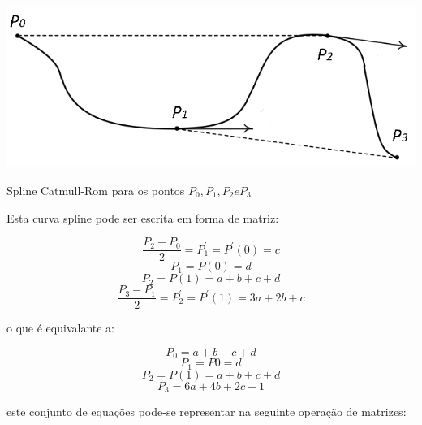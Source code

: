 \begin{center}
 	
 	\includegraphics[scale=0.5,keepaspectratio]{resources/catmullDeriv.png}
 	\captionsetup{type=figure, width=0.8\linewidth}
	\caption{Spline Catmull-Rom para os pontos $P_{0}, P_{1}, P_{2} e P_{3}$}
\label{fig:ssec1:diagram:plane:to:sphere} 
\end{center}

Esta curva spline pode ser escrita em forma de matriz:

\begin{equation}
\frac{P_{2}-P_{0}}{2} = P_{1}^{'} = P^{'}(0) = c  \nonumber
\end{equation}
\begin{equation}
P_{1} = P(0) = d 		\nonumber
\end{equation}
\begin{equation}
P_{2}=P(1)=a+b+c+d 		\nonumber
\end{equation}
\begin{equation}
\frac{P_{3}-P_{1}}{2} = P_{2}^{'} = P^{'}(1) = 3a+2b+c 
\end{equation}


o que é equivalante a:

\begin{equation}
P_{0} = a+b-c+d 		\nonumber
\end{equation}
\begin{equation}
P_{1} = P{0} = d 		\nonumber
\end{equation}
\begin{equation}
P_{2}=P(1)=a+b+c+d 		\nonumber
\end{equation}
\begin{equation}
P_{3}=6a+4b+2c+1
\end{equation}

este conjunto de equações pode-se representar na seguinte operação de matrizes:

